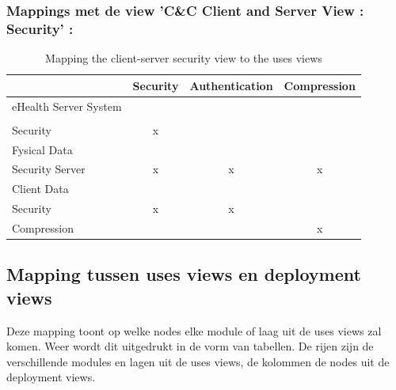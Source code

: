 \documentclass[a4paper,10pt]{article}
\begin{document}
\subsubsection*{Mappings met de view 'C\&C Client and Server View : Security' :}
\begin{table}[h!]
\begin{center}
 \begin{tabular}{l| c | c | c |} 
 & Security & Authentication & Compression \\ \hline
eHealth Server System & & & \\ \hline
\hspace{6pt} & & & \\ \hline
\hspace{12pt}Security & x & & \\ \hline
\hspace{6pt}Fysical Data & & & \\ \hline
\hspace{12pt}Security Server & x & x & x \\ \hline
\hspace{6pt}Client Data & & & \\ \hline
\hspace{12pt}Security & x & x & \\ \hline
\hspace{12pt}Compression & & & x \\ \hline
\end{tabular}
\caption{Mapping the client-server security view to the uses views}
\end{center}
\end{table}

\subsection{Mapping tussen uses views en deployment views}
Deze mapping toont op welke nodes elke module of laag uit de uses views zal komen. Weer wordt dit uitgedrukt in de vorm van tabellen. De rijen zijn de verschillende modules en lagen uit de uses views, de kolommen de nodes uit de deployment views.
\end{document}

